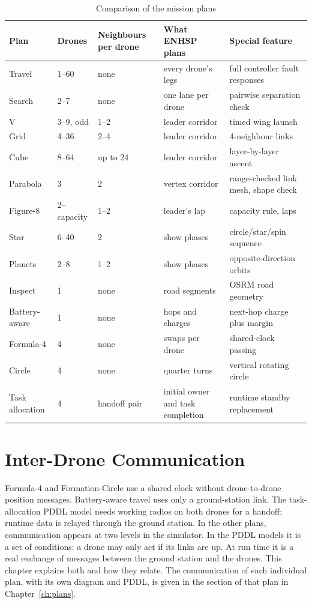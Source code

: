 \documentclass[11pt,a4paper,oneside]{report}
\newcommand{\maxTravel}{60}
\newcommand{\maxSearch}{7}
\newcommand{\maxV}{9}
\newcommand{\maxGrid}{36}
\newcommand{\maxCube}{64}
\newcommand{\maxStar}{40}
\newcommand{\maxPlanets}{8}
\begin{document}
\begin{table}[H]
\caption{Comparison of the mission plans}\label{tab:plansummary}
\small
\begin{tabularx}{\textwidth}{@{}lP{0.13\textwidth}P{0.13\textwidth}P{0.17\textwidth}Y@{}}
\toprule
\textbf{Plan} & \textbf{Drones} & \textbf{Neighbours per drone} & \textbf{What ENHSP plans} & \textbf{Special feature} \\
\midrule
Travel     & 1--\maxTravel & none & every drone's legs & full controller fault responses \\
Search     & 2--\maxSearch & none & one lane per drone & pairwise separation check \\
V          & 3--\maxV, odd & 1--2 & leader corridor & timed wing launch \\
Grid       & 4--\maxGrid & 2--4 & leader corridor & 4-neighbour links \\
Cube       & 8--\maxCube & up to 24 & leader corridor & layer-by-layer ascent \\
Parabola   & 3 & 2 & vertex corridor & range-checked link mesh, shape check \\
Figure-8   & 2--capacity & 1--2 & leader's lap & capacity rule, laps \\
Star       & 6--\maxStar & 2 & show phases & circle/star/spin sequence \\
Planets    & 2--\maxPlanets & 1--2 & show phases & opposite-direction orbits \\
Inspect    & 1 & none & road segments & OSRM road geometry \\
Battery-aware & 1 & none & hops and charges & next-hop charge plus margin \\
Formula-4 & 4 & none & swaps per drone & shared-clock passing \\
Circle & 4 & none & quarter turns & vertical rotating circle \\
Task allocation & 4 & handoff pair & initial owner and task completion & runtime standby replacement \\
\bottomrule
\end{tabularx}
\end{table}

\chapter{Inter-Drone Communication}\label{ch:comm}
Formula-4 and Formation-Circle use a shared clock without drone-to-drone position messages.
Battery-aware travel uses only a ground-station link. The task-allocation PDDL model needs
working radios on both drones for a handoff; runtime data is relayed through the ground station. In the other plans, communication appears at two levels in the simulator. In the PDDL models it is a set of
conditions: a drone may only act if its links are up. At run time it is a real exchange of
messages between the ground station and the drones. This chapter explains both and how they
relate. The communication of each individual plan, with its own diagram and PDDL, is given in
the section of that plan in Chapter~\ref{ch:plans}.
\end{document}
